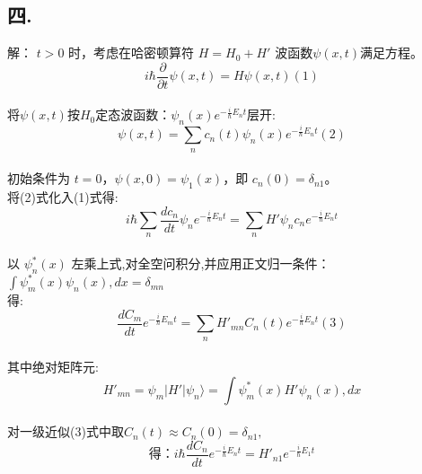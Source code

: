 \subsection{四.}
解：
$t > 0$ 时，考虑在哈密顿算符 $H = H_0 + H'$ 波函数$\psi(x,t)$满足方程。$$i\hbar \frac{\partial}{\partial t}\psi(x,t) = H \psi(x,t)(1)~$$\\
将$\psi(x,t)$按$H_0$定态波函数：$\psi_n(x) e^{-\frac{i}{\hbar} E_n t}$层开:\\
$$\psi(x,t) = \sum_{n} c_n(t) \psi_n(x) e^{-\frac{i}{\hbar} E_n t}(2)~$$\\
初始条件为 $t=0$，$\psi(x,0) = \psi_1(x)$，即 $c_n(0) = \delta_{n1}$。\\
将(2)式化入(1)式得:$$i\hbar \sum_n \frac{d c_n}{dt} \psi_n e^{-\frac{i}{\hbar} E_n t} = \sum_n H' \psi_n c_n e^{-\frac{i}{\hbar} E_n t}~$$\\
以 $\psi_n^*(x)$ 左乘上式,对全空问积分,并应用正文归一条件：$\int \psi_m^*(x) \psi_n(x) , dx = \delta_{mn}$\\
得: $$\frac{dC_m}{dt} e^{-\frac{i}{\hbar} E_m t} = \sum_n H'_{mn} C_n(t) e^{-\frac{i}{\hbar} E_n t}(3)~$$\\
其中绝对矩阵元:$$H'_{mn} = \psi_m | H' | \psi_n \rangle = \int \psi_m^*(x) H' \psi_n(x) , dx~$$\\
对一级近似(3)式中取$C_n(t) \approx C_n(0) = \delta_{n1},$
$$\text{得：}i\hbar\frac{dC_n}{dt} e^{-\frac{i}{\hbar} E_n t} = H'_{n1} e^{-\frac{i}{\hbar} E_1 t}~$$
